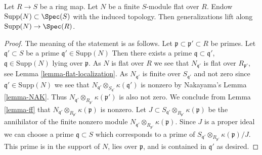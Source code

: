 \begin{lemma}
\label{lemma-going-down-flat-module}
Let $R \to S$ be a ring map. Let $N$ be a finite $S$-module flat over $R$.
Endow $\text{Supp}(N) \subset \Spec(S)$ with the induced topology.
Then generalizations lift along $\text{Supp}(N) \to \Spec(R)$.
\end{lemma}

\begin{proof}
The meaning of the statement is as follows. Let
$\mathfrak p \subset \mathfrak p' \subset R$ be primes. Let
$\mathfrak q' \subset S$ be a prime $\mathfrak q' \in \text{Supp}(N)$
Then there exists a prime $\mathfrak q \subset \mathfrak q'$,
$\mathfrak q \in \text{Supp}(N)$ lying over $\mathfrak p$.
As $N$ is flat over $R$ we see that $N_{\mathfrak q'}$ is flat
over $R_{\mathfrak p'}$, see Lemma \ref{lemma-flat-localization}.
As $N_{\mathfrak q'}$ is finite over $S_{\mathfrak q'}$
and not zero since $\mathfrak q' \in \text{Supp}(N)$ we see
that $N_{\mathfrak q'} \otimes_{S_{\mathfrak q'}} \kappa(\mathfrak q')$
is nonzero by Nakayama's Lemma \ref{lemma-NAK}.
Thus $N_{\mathfrak q'} \otimes_{R_{\mathfrak p'}} \kappa(\mathfrak p')$
is also not zero. We conclude from Lemma \ref{lemma-ff}
that $N_{\mathfrak q'} \otimes_{R_{\mathfrak p'}} \kappa(\mathfrak p)$
is nonzero. Let
$J \subset S_{\mathfrak q'} \otimes_{R_{\mathfrak p'}} \kappa(\mathfrak p)$
be the annihilator of the finite nonzero module
$N_{\mathfrak q'} \otimes_{R_{\mathfrak p'}} \kappa(\mathfrak p)$.
Since $J$ is a proper ideal we can choose a prime $\mathfrak q \subset S$
which corresponds to a prime of
$S_{\mathfrak q'} \otimes_{R_{\mathfrak p'}} \kappa(\mathfrak p)/J$.
This prime is in the support of $N$, lies over $\mathfrak p$, and
is contained in $\mathfrak q'$ as desired.
\end{proof}